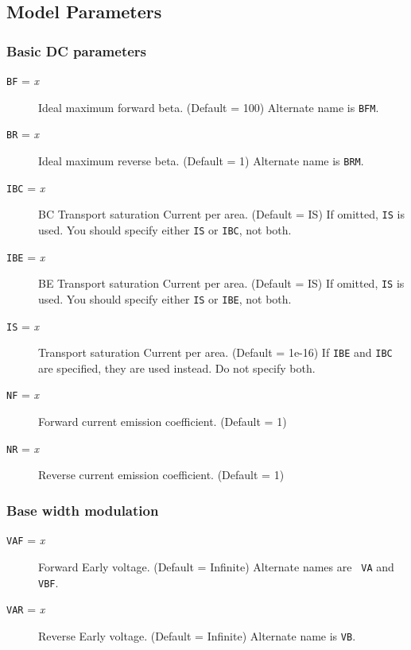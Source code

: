 \subsection{Model Parameters}

\subsubsection{Basic DC parameters}

\begin{description}

\item[{\tt BF} = {\it x}]
Ideal maximum forward beta. (Default = 100)  Alternate name is {\tt BFM}.

\item[{\tt BR} = {\it x}]
Ideal maximum reverse beta.  (Default = 1)  Alternate name is {\tt BRM}.

\item[{\tt IBC} = {\it x}]
BC Transport saturation Current per area.  (Default = IS) If omitted,
{\tt IS} is used.  You should specify either {\tt IS} or {\tt IBC},
not both.

\item[{\tt IBE} = {\it x}]
BE Transport saturation Current per area.  (Default = IS) If omitted,
{\tt IS} is used.  You should specify either {\tt IS} or {\tt IBE},
not both.

\item[{\tt IS} = {\it x}]
Transport saturation Current per area.  (Default = 1e-16) If {\tt IBE}
and {\tt IBC} are specified, they are used instead.  Do not specify
both.

\item[{\tt NF} = {\it x}]
Forward current emission coefficient.  (Default = 1)

\item[{\tt NR} = {\it x}]
Reverse current emission coefficient. (Default = 1)

\end{description}

\subsubsection{Base width modulation}

\begin{description}

\item[{\tt VAF} = {\it x}]
Forward Early voltage.  (Default = Infinite) Alternate names are {\tt
VA} and {\tt VBF}.

\item[{\tt VAR} = {\it x}]
Reverse Early voltage.  (Default = Infinite)  Alternate name is {\tt VB}.

\end{description}

